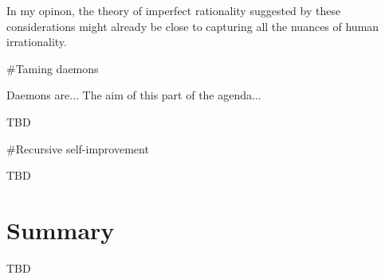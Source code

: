 \documentclass[a4paper]{article}
\begin{document}
In my opinon, the theory of imperfect rationality suggested by these considerations might already be close to capturing all the nuances of human irrationality.

\#Taming daemons

Daemons are... The aim of this part of the agenda...


TBD

\#Recursive self-improvement

TBD

\section{Summary}


TBD
\end{document}
